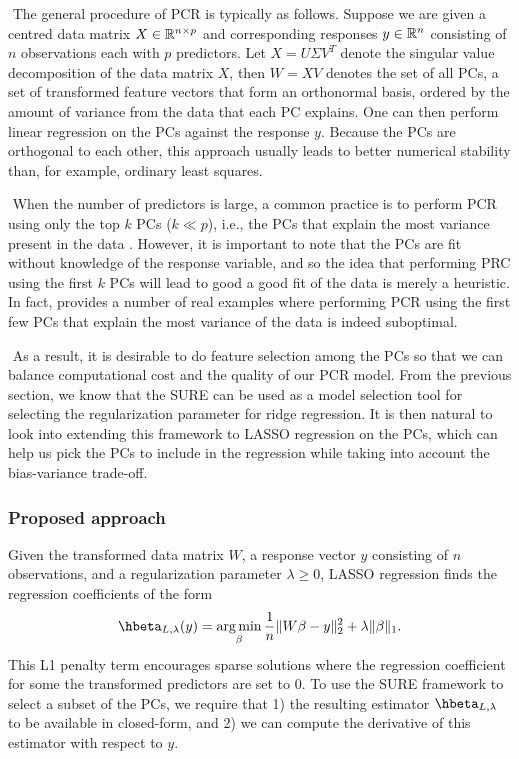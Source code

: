 $ $\newline
The general procedure of PCR is typically as follows. Suppose we are given a centred data matrix $X \in \mathbb{R}^{n\times p}$ and corresponding responses $y\in\mathbb{R}^n$ consisting of $n$ observations each with $p$ predictors. Let $X = U\Sigma V^T$ denote the singular value decomposition of the data matrix $X$, then $W = XV$ denotes the set of all PCs, a set of transformed feature vectors that form an orthonormal basis, ordered by the amount of variance from the data that each PC explains. One can then perform linear regression on the PCs against the response $y$. Because the PCs are orthogonal to each other, this approach usually leads to better numerical stability than, for example, ordinary least squares. 

$ $\newline
When the number of predictors is large, a common practice is to perform PCR using only the top $k$ PCs ($k\ll p$), i.e., the PCs that explain the most variance present in the data \citep{cera2019genes,harel2019predicting}. However, it is important to note that the PCs are fit without knowledge of the response variable, and so the idea that performing PRC using the first $k$ PCs will lead to good a good fit of the data is merely a heuristic. In fact, \citet{jolliffe1982note} provides a number of real examples where performing PCR using the first few PCs that explain the most variance of the data is indeed suboptimal.

$ $\newline
As a result, it is desirable to do feature selection among the PCs so that we can balance computational cost and the quality of our PCR model. From the previous section, we know that the SURE can be used as a model selection tool for selecting the regularization parameter for ridge regression. It is then natural to look into extending this framework to LASSO regression on the PCs, which can help us pick the PCs to include in the regression while taking into account the bias-variance trade-off.

\subsubsection{Proposed approach}
Given the transformed data matrix $W$, a response vector $y$ consisting of $n$ observations, and a regularization parameter $\lambda\geq0$, LASSO regression finds the regression coefficients of the form
\[
\hbeta_{L,\lambda}(y) = \argmin_{\beta} \frac{1}{n}\|W\beta - y\|_2^2 + \lambda\|\beta\|_1.
\]
This L1 penalty term encourages sparse solutions where the regression coefficient for some the transformed predictors are set to $0$. To use the SURE framework to select a subset of the PCs, we require that 1) the resulting estimator $\hbeta_{L,\lambda}$ to be available in closed-form, and 2) we can compute the derivative of this estimator with respect to $y$.

